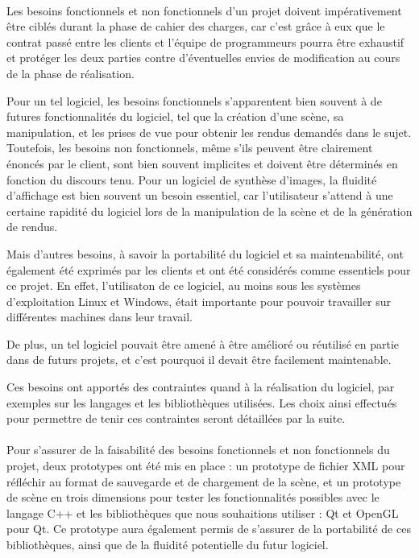 \paragraph{}
        Les besoins fonctionnels et non fonctionnels d'un projet doivent impérativement être ciblés durant la phase de cahier des charges, car c'est grâce à eux que le contrat passé entre les clients et l'équipe de programmeurs pourra être exhaustif et protéger les deux parties contre d'éventuelles envies de modification au cours de la phase de réalisation. 
        
Pour un tel logiciel, les besoins fonctionnels s'apparentent bien souvent à de futures fonctionnalités du logiciel, tel que la création d'une scène, sa manipulation, et les prises de vue pour obtenir les rendus demandés dans le sujet. 
Toutefois, les besoins non fonctionnels, même s'ils peuvent être clairement énoncés par le client, sont bien souvent implicites et doivent être déterminés en fonction du discours tenu. Pour un logiciel de synthèse d'images, la fluidité d'affichage est bien souvent un besoin essentiel, car l'utilisateur s'attend à une certaine rapidité du logiciel lors de la manipulation de la scène et de la génération de rendus. 

Mais d'autres besoins, à savoir la portabilité du logiciel et sa maintenabilité, ont également été exprimés par les clients et ont été considérés comme essentiels pour ce projet. En effet, l'utilisaton de ce logiciel, au moins sous les systèmes d'exploitation Linux et Windows, était importante pour pouvoir travailler sur différentes machines dans leur travail. 

De plus, un tel logiciel pouvait être amené à être amélioré ou réutilisé en partie dans de futurs projets, et c'est pourquoi il devait être facilement maintenable.

Ces besoins ont apportés des contraintes quand à la réalisation du logiciel, par exemples sur les langages et les bibliothèques utilisées. Les choix ainsi effectués pour permettre de tenir ces contraintes seront détaillées par la suite.

\paragraph{}
Pour s'assurer de la faisabilité des besoins fonctionnels et non fonctionnels du projet, deux prototypes ont été mis en place : un prototype de fichier XML pour réfléchir au format de sauvegarde et de chargement de la scène, et un prototype de scène en trois dimensions pour tester les fonctionnalités possibles avec le langage C++ et les bibliothèques que nous souhaitions utiliser : Qt et OpenGL pour Qt. Ce prototype aura également permis de s'assurer de la portabilité de ces bibliothèques, ainsi que de la fluidité potentielle du futur logiciel.

